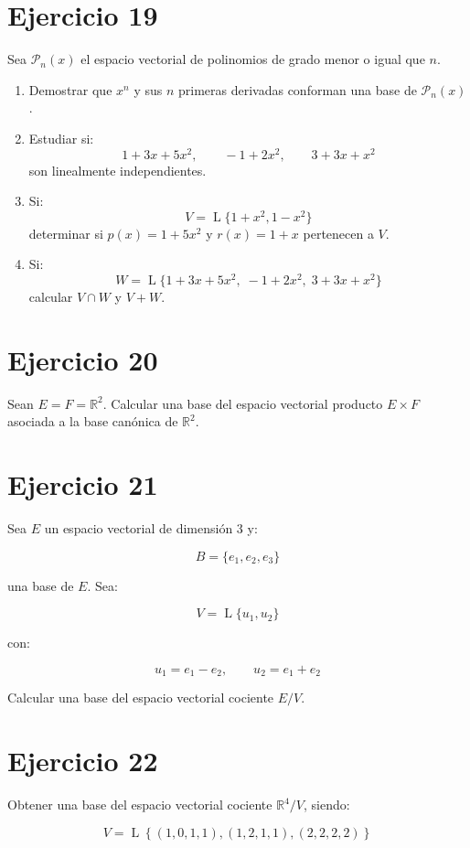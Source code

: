 \documentclass[11pt,a4paper]{article}
\newcommand{\R}{\mathbb{R}}
\newcommand{\Pn}{\mathcal{P}}
\newcommand{\Span}{\operatorname{L}}
\begin{document}
\section{Ejercicio 19}
Sea $\Pn_n(x)$ el espacio vectorial de polinomios de grado menor o igual que $n$.

\begin{enumerate}[label=\alph*)]
	\item Demostrar que $x^n$ y sus $n$ primeras derivadas conforman una base de $\Pn_n(x)$.
	\item Estudiar si:
	\[
	1+3x+5x^2,\qquad
	-1+2x^2,\qquad
	3+3x+x^2
	\]
	son linealmente independientes.
	\item Si:
	\[
	V=
	\Span\{1+x^2,1-x^2\}
	\]
	determinar si $p(x)=1+5x^2$ y $r(x)=1+x$ pertenecen a $V$.
	\item Si:
	\[
	W=
	\Span\{1+3x+5x^2,\;-1+2x^2,\;3+3x+x^2\}
	\]
	calcular $V\cap W$ y $V+W$.
\end{enumerate}

\section{Ejercicio 20}
Sean $E=F=\R^2$. Calcular una base del espacio vectorial producto $E\times F$ asociada a la base canónica de $\R^2$.

\section{Ejercicio 21}
Sea $E$ un espacio vectorial de dimensión $3$ y:

\[
B=\{e_1,e_2,e_3\}
\]

una base de $E$. Sea:

\[
V=
\Span\{u_1,u_2\}
\]

con:

\[
u_1=e_1-e_2,
\qquad
u_2=e_1+e_2
\]

Calcular una base del espacio vectorial cociente $E/V$.

\section{Ejercicio 22}
Obtener una base del espacio vectorial cociente $\R^4/V$, siendo:

\[
V=
\Span\left\{
(1,0,1,1),
(1,2,1,1),
(2,2,2,2)
\right\}
\]
\end{document}
